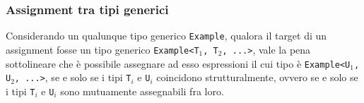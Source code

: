 \subsubsection{Assignment tra tipi generici}
Considerando un qualunque tipo generico \texttt{Example}, qualora il target di un assignment fosse un 
tipo generico \texttt{Example<T$_1$, T$_2$, ...>}, vale la pena sottolineare che è possibile assegnare 
ad esso espressioni il cui tipo è \texttt{Example<U$_1$, U$_2$, ...>}, se e solo se i tipi \texttt{T$_i$} e 
\texttt{U$_i$} coincidono strutturalmente, ovvero se e solo se i tipi \texttt{T$_i$} e 
\texttt{U$_i$} sono mutuamente assegnabili fra loro. \\